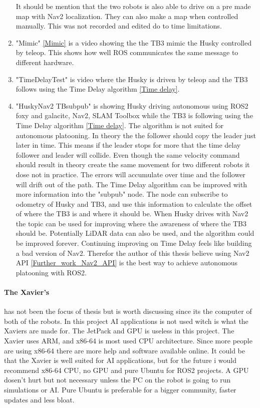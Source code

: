\begin{enumerate}
    It should be mention that the two robots is also able to drive on a pre made map with Nav2 localization. They can also make a map when controlled manually. This was not recorded and edited do to time limitations. 

    \item "Mimic" \ref{Mimic} is a video showing the the TB3 mimic the Husky controlled by teleop. This shows how well ROS communicates the same message to different hardware.
    
    \item "TimeDelayTest" is video where the Husky is driven by teleop and the TB3 follows using the Time Delay algorithm \ref{Time delay}. 
    
    \item "HuskyNav2 TBsubpub" \label{HuskyNav2 TBsubpub} is showing Husky driving autonomous using ROS2 foxy and galacitc, Nav2, SLAM Toolbox while the TB3 is following using the Time Delay algorithm \ref{Time delay}. The algorithm is not suited for autonomous platooning. In theory the the follower should copy the leader just later in time. This means if the leader stops for more that the time delay follower and leader will collide. Even though the same velocity command should result in theory create the same movement for two different robots it dose not in practice. The errors will accumulate over time and the follower will drift out of the path. The Time Delay algorithm can be improved with more information into the "subpub" node. The node can subscribe to odometry of Husky and TB3, and use this information to calculate the offset of where the TB3 is and where it should be. When Husky drives with Nav2 the topic  can be used for improving where the awareness of where the TB3 should be. Potentially LiDAR data can also be used, and the algorithm could be improved forever. Continuing improving on Time Delay feels like building a bad version of Nav2. Therefor the author of this thesis believe using Nav2 API \ref{Further_work_Nav2_API} is the best way to achieve autonomous platooning with ROS2. 
    
\end{enumerate}

\paragraph{The Xavier's} has not been the focus of thesis but is worth discussing since its the computer of both of the robots. In this project AI applications is not used witch is what the Xaviers are made for. The JetPack and GPU is useless in this project. The Xavier uses ARM, and x86-64 is most used CPU architecture. Since more people are using x86-64 there are more help and software available online. 
It could be that the Xavier is well suited for AI applications, but for the future i would recommend x86-64 CPU, no GPU and pure Ubuntu for ROS2 projects. A GPU dosen't hurt but not necessary unless the PC on the robot is going to run simulations or AI. Pure Ubuntu is preferable for a bigger community, faster updates and less bloat. 

